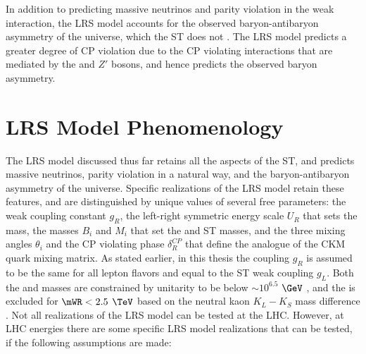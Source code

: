 In addition to predicting massive neutrinos and parity violation in the weak interaction, the LRS model accounts 
for the observed baryon-antibaryon asymmetry of the universe, which the ST does not \cite{surveyOfExtensions}.  
The LRS model predicts a greater degree of CP violation due to the CP violating interactions that are mediated by 
the \WR and $Z'$ bosons, and hence predicts the observed baryon asymmetry.


\section{LRS Model Phenomenology}
\label{sec:lrsPhenomenology}


The LRS model discussed thus far retains all the aspects of the ST, and predicts 
massive neutrinos, parity violation in a natural way, and the baryon-antibaryon asymmetry of the universe.  
Specific realizations of the LRS model retain these features, and are distinguished by unique values of 
several free parameters: the weak coupling constant $g_{R}$, the left-right symmetric energy scale $U_{R}$ 
that sets the \WR mass, the masses $B_{i}$ and $M_{i}$ that set the \nul and ST \nu masses, and the three 
mixing angles $\theta_{i}$ and the CP violating phase $\delta_{R}^{CP}$ that define the \WR analogue 
of the CKM quark mixing matrix.  As stated earlier, in this thesis the coupling $g_{R}$ is assumed to be 
the same for all lepton flavors and equal to the ST weak coupling $g_{L}$.  Both the \WR and \nul masses 
are constrained by unitarity to be below $\sim10^{6.5}$ $\GeV$ \cite{lrsMassConstraints}, and the \WR is 
excluded for $\mWR < 2.5$ $\TeV$ based on the neutral kaon $K_{L} - K_{S}$ mass difference \cite{mwrBoundFromNeutralKaons}.  
Not all realizations of the LRS model can be tested at the LHC.  However, at LHC energies there are some 
specific LRS model realizations that can be tested, if the following assumptions are made:

